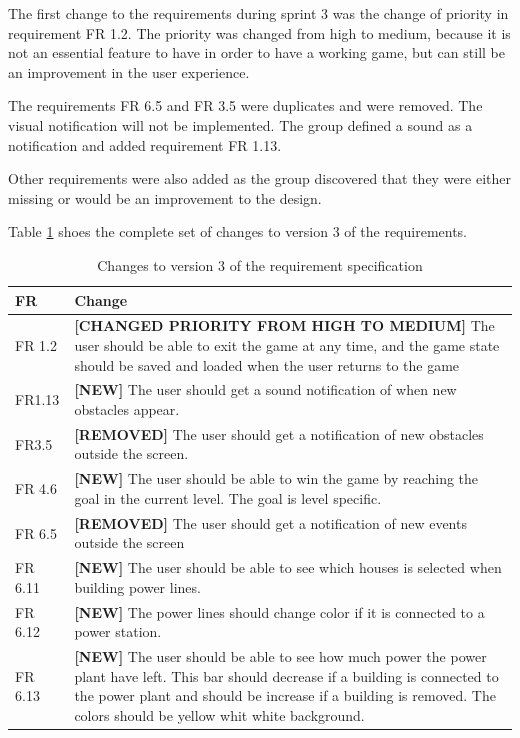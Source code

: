 	The first change to the requirements during sprint 3 was the change of priority in requirement FR 1.2. The priority was changed from high to medium, because it is not an essential feature to have in order to have a working game, but can still be an improvement in the user experience.

	The requirements FR 6.5 and FR 3.5 were duplicates and were removed. The visual notification will not be implemented. The group defined a sound as a notification and added requirement FR 1.13.

	Other requirements were also added as the group discovered that they were either missing or would be an improvement to the design.

	Table \ref{table:reqspec3} shoes the complete set of changes to version 3 of the requirements.
	
	\begin{table}[H]
	\begin{tabular}{| p{1.5cm} | p{12cm} |}
		\hline
		\rowcolor{lightgray}
		{\bf FR} & {\bf Change} \\ \hline
		FR 1.2 & {\bf \color{orange}[CHANGED PRIORITY FROM HIGH TO MEDIUM]} The user should be able 
		to exit the game at any time, and the game state should be saved and loaded when the user 
		returns to the game \\ \hline
		FR1.13 & {\bf \color{green}[NEW]} The user should get a sound notification of when new obstacles appear. \\ \hline
		FR3.5 & {\bf \color{red}[REMOVED]}  The user should get a notification of new obstacles outside the screen. \\ \hline
		FR 4.6 & {\bf \color{green}[NEW]} The user should be able to win the game by reaching the goal in the current level. The goal is level specific. \\ \hline
		FR 6.5 & {\bf \color{red}[REMOVED]} The user should get a notification of new events outside 
		the screen \\ \hline
		FR 6.11 & {\bf \color{green}[NEW]} The user should be able to see which houses is selected when building power lines. \\ \hline
		FR 6.12 & {\bf \color{green}[NEW]} The power lines should change color if it is connected to a power 
		station. \\ \hline
		FR 6.13 & {\bf \color{green}[NEW]} The user should be able to see how much power the 
		power plant have left. This bar should decrease if a building is connected to the power plant 
		and should be increase if a building is removed. The colors should be yellow whit white 
		background. \\ \hline
	\end{tabular}
	\caption{Changes to version 3 of the requirement specification}
	\label{table:reqspec3}
	\end{table}

